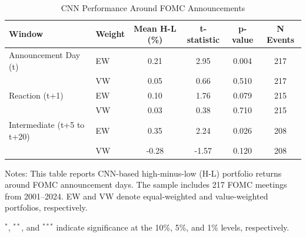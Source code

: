 \begin{table}[htbp]
    \centering
    \caption{CNN Performance Around FOMC Announcements}
    \label{tab:fomc_event_template}
    \begin{threeparttable}
    \begin{tabular}{ll
                    S[table-format=1.2]
                    S[table-format=-1.2]
                    S[table-format=1.3]
                    S[table-format=3.0]}
        \toprule
        {Window} & {Weight} & {Mean H-L (\%)} & {t-statistic} & {p-value} & {N Events} \\
        \midrule
        Announcement Day (t) & EW & 0.21\tnote{***} & 2.95 & 0.004 & 217 \\
                             & VW & 0.05 & 0.66 & 0.510 & 217 \\
        Reaction (t+1) & EW & 0.10\tnote{*} & 1.76 & 0.079 & 215 \\
                       & VW & 0.03 & 0.38 & 0.710 & 215 \\
        Intermediate (t+5 to t+20) & EW & 0.35\tnote{**} & 2.24 & 0.026 & 208 \\
                                   & VW & -0.28 & -1.57 & 0.120 & 208 \\
        \bottomrule
    \end{tabular}
    \begin{tablenotes}
        \footnotesize
        \item Notes: This table reports CNN-based high-minus-low (H-L) portfolio returns around FOMC
        announcement days. The sample includes 217 FOMC meetings from 2001--2024. EW and VW denote
        equal-weighted and value-weighted portfolios, respectively.
        \item $^{*}$, $^{**}$, and $^{***}$ indicate significance at the 10\%, 5\%, and 1\% levels, respectively.
    \end{tablenotes}
    \end{threeparttable}
\end{table}


